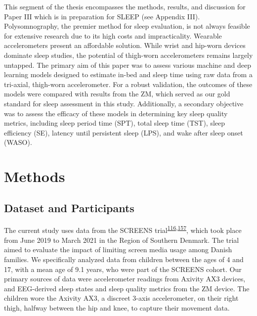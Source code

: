 \documentclass[
  10pt,
]{scrbook}
\begin{document}
This segment of the thesis encompasses the methods, results, and
discussion for Paper III which is in preparation for SLEEP (see Appendix
III). Polysomnography, the premier method for sleep evaluation, is not
always feasible for extensive research due to its high costs and
impracticality. Wearable accelerometers present an affordable solution.
While wrist and hip-worn devices dominate sleep studies, the potential
of thigh-worn accelerometers remains largely untapped. The primary aim
of this paper was to assess various machine and deep learning models
designed to estimate in-bed and sleep time using raw data from a
tri-axial, thigh-worn accelerometer. For a robust validation, the
outcomes of these models were compared with results from the ZM, which
served as our gold standard for sleep assessment in this study.
Additionally, a secondary objective was to assess the efficacy of these
models in determining key sleep quality metrics, including sleep period
time (SPT), total sleep time (TST), sleep efficiency (SE), latency until
persistent sleep (LPS), and wake after sleep onset (WASO).

\hypertarget{methods-2}{%
\section{Methods}\label{methods-2}}

\hypertarget{dataset-and-participants}{%
\subsection{Dataset and Participants}\label{dataset-and-participants}}

The current study uses data from the SCREENS
trial\textsuperscript{\protect\hyperlink{ref-rasmussen_short-term_2020}{116},\protect\hyperlink{ref-pedersen_effects_2022}{157}},
which took place from June 2019 to March 2021 in the Region of Southern
Denmark. The trial aimed to evaluate the impact of limiting screen media
usage among Danish families. We specifically analyzed data from children
between the ages of 4 and 17, with a mean age of 9.1 years, who were
part of the SCREENS cohort. Our primary sources of data were
accelerometer readings from Axivity AX3 devices, and EEG-derived sleep
states and sleep quality metrics from the ZM device. The children wore
the Axivity AX3, a discreet 3-axis accelerometer, on their right thigh,
halfway between the hip and knee, to capture their movement data.
\end{document}
